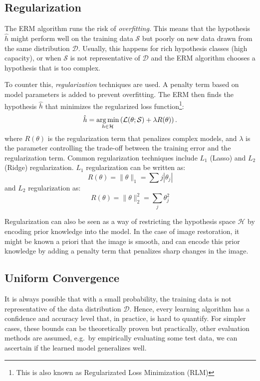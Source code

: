\subsection{Regularization}
The \gls{ERM} algorithm runs the risk of \textit{overfitting}. This means that the hypothesis $\hat{h}$ might perform well on the training data $\mathcal{S}$ but poorly on new data drawn from the same distribution $\mathcal{D}$. Usually, this happens for rich hypothesis classes (high capacity), or when $\mathcal{S}$ is not representative of $\mathcal{D}$ and the \gls{ERM} algorithm chooses a hypothesis that is too complex. 

To counter this, \textit{regularization} techniques are used. A penalty term based on model parameters is added to prevent overfitting. The \gls{ERM} then finds the hypothesis $\hat{h}$ that minimizes the regularized loss function\footnote{This is also known as Regularizated Loss Minimization (RLM)}:
\begin{equation}
    \hat{h} = \operatorname*{arg\,min}_{h \in \mathcal{H}} \left(\mathcal{L}(\theta; \mathcal{S})  + \lambda R(\theta) \right).
\end{equation}
where $R(\theta)$ is the regularization term that penalizes complex models, and $\lambda$ is the parameter controlling the trade-off between the training error and the regularization term. Common regularization techniques include $L_1$ (Lasso) and $L_2$ (Ridge) regularization. $L_1$ regularization can be written as:
\begin{equation*}
    R(\theta) = \|\theta\|_1 = \sum{j} |\theta_j|
\end{equation*}
and $L_2$ regularization as:
\begin{equation*}
    R(\theta) = \|\theta\|^2_2 = \sum_{j} \theta_j^2
\end{equation*}

Regularization can also be seen as a way of restricting the hypothesis space $\mathcal{H}$ by encoding prior knowledge into the model. In the case of image restoration, it might be known a priori that the image is smooth, and  can encode this prior knowledge by adding a penalty term that penalizes sharp changes in the image.


\subsection{Uniform Convergence}
It is always possible that with a small probability, the training data is not representative of the data distribution $\mathcal{D}$. Hence, every learning algorithm has a confidence and accuracy level that, in practice, is hard to quantify. For simpler cases, these bounds can be theoretically proven but practically, other evaluation methods are assumed, e.g.\ by empirically evaluating some test data, we can ascertain if the learned model generalizes well.

